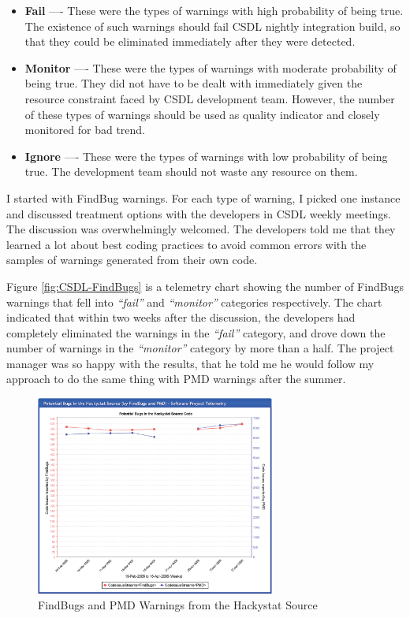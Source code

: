 \begin{itemize}
	\item \textbf{Fail} ---- These were the types of warnings with high probability of being true. The existence of such warnings should fail CSDL nightly integration build, so that they could be eliminated immediately after they were detected.
	
	\item \textbf{Monitor} ---- These were the types of warnings with moderate probability of being true. They did not have to be dealt with immediately given the resource constraint faced by CSDL development team. However, the number of these types of warnings should be used as quality indicator and closely monitored for bad trend.

	\item \textbf{Ignore} ---- These were the types of warnings with low probability of being true. The development team should not waste any resource on them.
\end{itemize}

I started with FindBug warnings. For each type of warning, I picked one instance and discussed treatment options with the developers in CSDL weekly meetings. The discussion was overwhelmingly welcomed. The developers told me that they learned a lot about best coding practices to avoid common errors with the samples of warnings generated from their own code.
 
Figure \ref{fig:CSDL-FindBugs} is a telemetry chart showing the number of FindBugs warnings that fell into \textit{``fail''} and \textit{``monitor''} categories respectively. The chart indicated that within two weeks after the discussion, the developers had completely eliminated the warnings in the \textit{``fail''} category, and drove down the number of warnings in the \textit{``monitor''} category by more than a half. The project manager was so happy with the results, that he told me he would follow my approach to do the same thing with PMD warnings after the summer. 

\begin{figure}[p]
  \center
  \includegraphics[width=0.70\textwidth]{figures/CSDL-FindBugs-PMD}
  \caption{FindBugs and PMD Warnings from the Hackystat Source} 
  \label{fig:CSDL-FindBugs-PMD}
\end{figure}

